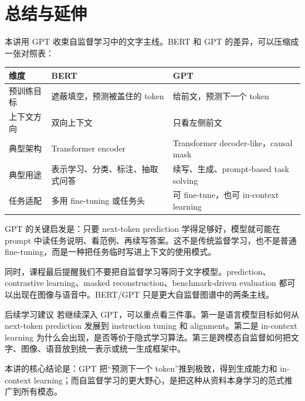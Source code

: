 \documentclass[a4paper]{article}
\begin{document}
\section{总结与延伸}

本讲用 GPT 收束自监督学习中的文字主线。BERT 和 GPT 的差异，可以压缩成一张对照表：

\begin{center}
\begin{tabular}{L{0.20\textwidth} L{0.34\textwidth} L{0.34\textwidth}}
\toprule
维度 & BERT & GPT \\
\midrule
预训练目标 & 遮蔽填空，预测被盖住的 token & 给前文，预测下一个 token \\
上下文方向 & 双向上下文 & 只看左侧前文 \\
典型架构 & Transformer encoder & Transformer decoder-like，causal mask \\
典型用途 & 表示学习、分类、标注、抽取式问答 & 续写、生成、prompt-based task solving \\
任务适配 & 多用 fine-tuning 或任务头 & 可 fine-tune，也可 in-context learning \\
\bottomrule
\end{tabular}
\end{center}

GPT 的关键启发是：只要 next-token prediction 学得足够好，模型就可能在 prompt 中读任务说明、看范例、再续写答案。这不是传统监督学习，也不是普通 fine-tuning，而是一种把任务临时写进上下文的使用模式。

同时，课程最后提醒我们不要把自监督学习等同于文字模型。prediction、contrastive learning、masked reconstruction、benchmark-driven evaluation 都可以出现在图像与语音中。BERT/GPT 只是更大自监督图谱中的两条主线。

\begin{knowledgebox}{后续学习建议}
    若继续深入 GPT，可以重点看三件事。第一是语言模型目标如何从 next-token prediction 发展到 instruction tuning 和 alignment。第二是 in-context learning 为什么会出现，是否等价于隐式学习算法。第三是跨模态自监督如何把文字、图像、语音放到统一表示或统一生成框架中。
\end{knowledgebox}

本讲的核心结论是：GPT 把“预测下一个 token”推到极致，得到生成能力和 in-context learning；而自监督学习的更大野心，是把这种从资料本身学习的范式推广到所有模态。
\end{document}

